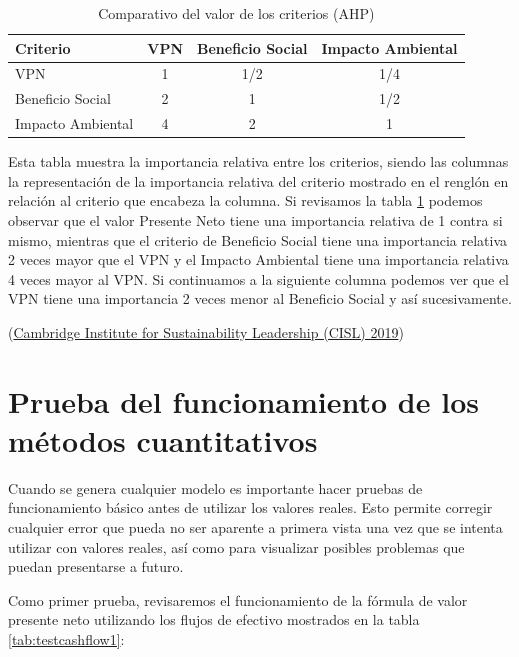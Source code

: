 \documentclass[
]{book}
\begin{document}
\begin{table}

\caption{\label{tab:critcomparison}Comparativo del valor de los criterios (AHP)}
\centering
\begin{tabular}[t]{l|c|c|c}
\hline
Criterio & VPN & Beneficio Social & Impacto Ambiental\\
\hline
VPN & 1 & 1/2 & 1/4\\
\hline
Beneficio Social & 2 & 1 & 1/2\\
\hline
Impacto Ambiental & 4 & 2 & 1\\
\hline
\end{tabular}
\end{table}

Esta tabla muestra la importancia relativa entre los criterios, siendo las columnas la representación de la importancia relativa del criterio mostrado en el renglón en relación al criterio que encabeza la columna. Si revisamos la tabla \ref{tab:critcomparison} podemos observar que el valor Presente Neto tiene una importancia relativa de 1 contra si mismo, mientras que el criterio de Beneficio Social tiene una importancia relativa 2 veces mayor que el VPN y el Impacto Ambiental tiene una importancia relativa 4 veces mayor al VPN. Si continuamos a la siguiente columna podemos ver que el VPN tiene una importancia 2 veces menor al Beneficio Social y así sucesivamente.

(\protect\hyperlink{ref-CISL2019}{Cambridge Institute for Sustainability Leadership (CISL) 2019})

\newpage

\hypertarget{prueba-del-funcionamiento-de-los-muxe9todos-cuantitativos}{%
\section{Prueba del funcionamiento de los métodos cuantitativos}\label{prueba-del-funcionamiento-de-los-muxe9todos-cuantitativos}}

Cuando se genera cualquier modelo es importante hacer pruebas de
funcionamiento básico antes de utilizar los valores reales. Esto permite
corregir cualquier error que pueda no ser aparente a primera vista una
vez que se intenta utilizar con valores reales, así como para visualizar
posibles problemas que puedan presentarse a futuro.

Como primer prueba, revisaremos el funcionamiento de la fórmula de valor
presente neto utilizando los flujos de efectivo mostrados en la tabla
\ref{tab:testcashflow1}:
\end{document}
